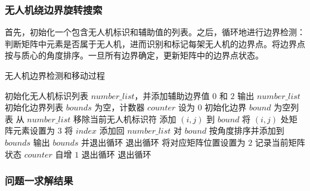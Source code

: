 \documentclass[bwprint]{gmcmthesis}
\numberwithin{figure}{section}
\begin{document}
\subsubsection{无人机绕边界旋转搜索}
首先，初始化一个包含无人机标识和辅助值的列表。之后，循环地进行边界检测：判断矩阵中元素是否属于无人机，进而识别和标记每架无人机的边界点。将边界点按与质心的角度排序。一旦所有边界确定，更新矩阵中的边界点状态。

\begin{algorithm}
	\caption{无人机边界检测和移动过程}
	\begin{algorithmic}[1]
		\State 初始化无人机标识列表 $number\_list$，并添加辅助边界值 $0$ 和 $2$
		\State 输出 $number\_list$
		\State 初始化边界列表 $bounds$ 为空，计数器 $counter$ 设为 $0$
		\State 初始化边界 $bound$ 为空列表
		\State 从 $number\_list$ 移除当前无人机标识符
		\State 添加 $(i, j)$ 到 $bound$
		\State 将 $(i, j)$ 处矩阵元素设置为 $3$
		\EndIf
		\EndFor
		\State 将 $index$ 添加回 $number\_list$
		\State 对 $bound$ 按角度排序并添加到 $bounds$
		\EndFor
		\State 输出 $bounds$ 并退出循环
		\EndIf
		\State 退出循环
		\EndIf
		\State 将对应矩阵位置设置为 $2$
		\EndIf
		\EndFor
		\State 记录当前矩阵状态
		\EndIf
		\State $counter$ 自增 $1$
		\State 退出循环
		\EndIf
		\EndWhile
		\State 退出循环
		\EndIf
		\EndWhile
	\end{algorithmic}
\end{algorithm}

\subsubsection{问题一求解结果}
\end{document}
